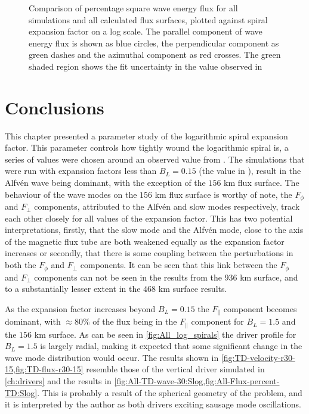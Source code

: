 \documentclass[a4paper,12pt,fourier,authoryear,custommargin]{Classes/PhDThesisPSnPDF}
\begin{document}
\begin{figure}[h]
    \centering
    \caption{Comparison of percentage square wave energy flux for all simulations and all calculated flux surfaces, plotted against spiral expansion factor on a log scale. The parallel component of wave energy flux is shown as blue circles, the perpendicular component as green dashes and the azimuthal component as red crosses. The green shaded region shows the fit uncertainty in the value observed in \citet{bonet2008}}
    \label{fig:expfac-flux-comparison}
\end{figure}

\section{Conclusions}

This chapter presented a parameter study of the logarithmic spiral expansion factor.
This parameter controls how tightly wound the logarithmic spiral is, a series of values were chosen around an observed value from \cite{bonet2008}.
The simulations that were run with expansion factors less than $B_L=0.15$ (the value in \cite{bonet2008}), result in the Alfv\'en wave being dominant, with the exception of the $156$ km flux surface.
The behaviour of the wave modes on the $156$ km flux surface is worthy of note, the $F_\phi$ and $F_\perp$ components, attributed to the Alfv\'en and slow modes respectively, track each other closely for all values of the expansion factor.
This has two potential interpretations, firstly, that the slow mode and the Alfv\'en mode, close to the axis of the magnetic flux tube are both weakened equally as the expansion factor increases or secondly, that there is some coupling between the perturbations in both the $F_\phi$ and $F_\perp$ components.
It can be seen that this link between the $F_\phi$ and $F_\perp$ components can not be seen in the results from the $936$ km surface, and to a substantially lesser extent in the $468$ km surface results.

As the expansion factor increases beyond $B_L=0.15$ the $F_\parallel$ component becomes dominant, with $\approx 80$\% of the flux being in the $F_\parallel$ component for $B_L=1.5$ and the $156$ km surface.
As can be seen in \cref{fig:All_log_spirals} the driver profile for $B_L=1.5$ is largely radial, making it expected that some significant change in the wave mode distribution would occur.
The results shown in \cref{fig:TD-velocity-r30-15,fig:TD-flux-r30-15} resemble those of the vertical driver simulated in \cref{ch:drivers} and the results in \cref{fig:All-TD-wave-30:Slog,fig:All-Flux-percent-TD:Slog}.
This is probably a result of the spherical geometry of the problem, and it is interpreted by the author as both drivers exciting sausage mode oscillations.
\end{document}
